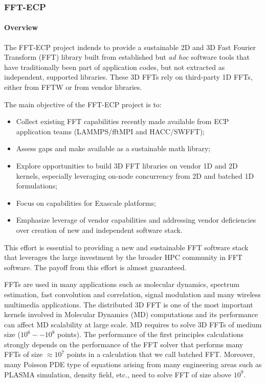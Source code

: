\subsubsection{ FFT-ECP}\label{subsubsect:fftecp}


\paragraph{Overview}

The FFT-ECP project indends to provide a sustainable 2D and 3D Fast Fourier 
Transform (FFT) library built from established but {\it ad hoc} 
software tools that have traditionally been part of application 
codes, but not extracted as independent, supported libraries. 
These 3D FFTs rely on third-party 1D FFTs, either from FFTW or 
from vendor libraries.

The main objective of the FFT-ECP project is to:
\begin{itemize}
\item Collect existing FFT capabilities recently made available from ECP 
      application teams (LAMMPS/fftMPI and HACC/SWFFT);
\item Assess gaps and make available as a sustainable math library;
\item Explore opportunities to build 3D FFT libraries on vendor 1D and 
      2D kernels, especially leveraging on-node concurrency from 2D and 
      batched 1D formulations;
\item Focus on capabilities for Exascale platforms;
\item Emphasize leverage of vendor capabilities and addressing vendor 
      deficiencies over creation of new and independent software stack.
\end{itemize}

This effort is 
essential to providing a new and sustainable FFT software stack that 
leverages the large investment by the broader HPC community in FFT 
software. The payoff from this effort is almost guaranteed. 

FFTs are used in many applications such as molecular dynamics, 
spectrum estimation, fast convolution and correlation, signal 
modulation and many wireless multimedia applications. The 
distributed 3D FFT is one of the most important kernels involved 
in Molecular Dynamics (MD) computations and its performance can 
affect MD scalability at large scale. MD requires to solve 3D FFTs 
of medium size ($10^6--10^8$ points). The performance of the first 
principles calculations strongly depends on the performance of the 
FFT solver that performs many FFTs of size $\approx 10^7$ points in 
a calculation that we call batched FFT. Moreover, many Poisson PDE 
type of equations arising from many engineering areas such as PLASMA 
simulation, density field, etc., need to solve FFT of size above $10^9$. 

